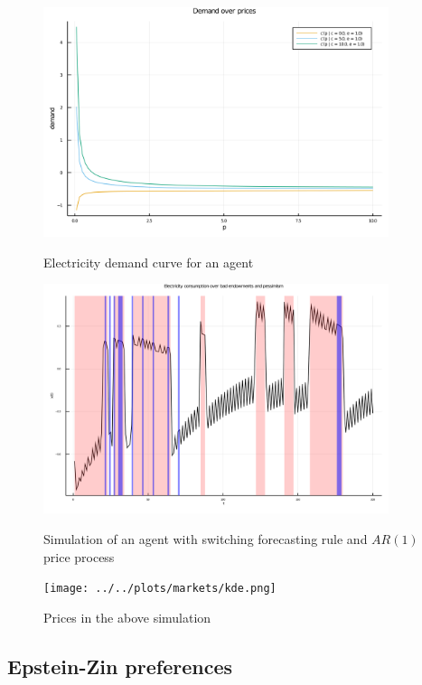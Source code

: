 \documentclass[american]{scrartcl}
\begin{document}
\begin{figure}[b]
    \centering
    \includegraphics[width=0.9\textwidth]{../../plots/markets/pricedemand.png}
    \label{fig:demand}
    \caption{Electricity demand curve for an agent}
\end{figure}

\begin{figure}
    \centering
    \includegraphics[width=0.9\textwidth]{../../plots/markets/simul.png}
    \label{fig:sim}
    \caption{Simulation of an agent with switching forecasting rule and $AR(1)$ price process}
\end{figure}

\begin{figure}
    \centering
    \texttt{[image: ../../plots/markets/kde.png]}
    \label{fig:price}
    \caption{Prices in the above simulation}
\end{figure}

\iffalse
    \subsection{Epstein-Zin preferences}
\end{document}

